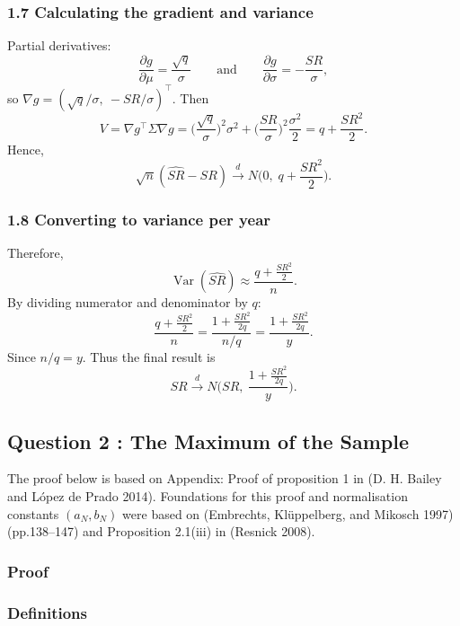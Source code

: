 \documentclass[
  12pt,
]{article}
\begin{document}
\subsubsection{1.7 Calculating the gradient and
variance}\label{calculating-the-gradient-and-variance}

Partial derivatives: \[
\frac{\partial g}{\partial\mu}=\frac{\sqrt{q}}{\sigma} \qquad \text{and} \qquad
\frac{\partial g}{\partial\sigma}=-\frac{SR}{\sigma},
\] so \(\nabla g=(\sqrt{q}/\sigma,\ -SR/\sigma)^\top\). Then \[
V=\nabla g^\top\Sigma\nabla g
= \Big(\frac{\sqrt{q}}{\sigma}\Big)^2\sigma^2 + \Big(\frac{SR}{\sigma}\Big)^2\frac{\sigma^2}{2}
= q + \frac{SR^2}{2}.
\] Hence, \[
\sqrt{n}(\widehat{SR}-SR)\xrightarrow{d} N\!\Big(0,\; q+\frac{SR^2}{2}\Big).
\]

\subsubsection{1.8 Converting to variance per
year}\label{converting-to-variance-per-year}

Therefore,\[
\operatorname{Var}(\widehat{SR})\approx\frac{q+\tfrac{SR^2}{2}}{n}.
\] By dividing numerator and denominator by \(q\): \[
\frac{q+\tfrac{SR^2}{2}}{n}=\frac{1+\tfrac{SR^2}{2q}}{\,n/q\,}= \frac{1+\tfrac{SR^2}{2q}}{y}.
\] Since \(n/q=y\). Thus the final result is \[
\widehat{SR}\xrightarrow{d} N\!\Big(SR,\ \frac{1+\tfrac{SR^2}{2q}}{y}\Big).
\]

\subsection{Question 2 : The Maximum of the
Sample}\label{question-2-the-maximum-of-the-sample}

The proof below is based on Appendix: Proof of proposition 1 in (D. H.
Bailey and López de Prado 2014). Foundations for this proof and
normalisation constants \((a_N,b_N)\) were based on (Embrechts,
Klüppelberg, and Mikosch 1997) (pp.138--147) and Proposition 2.1(iii) in
(Resnick 2008).

\subsubsection{Proof}\label{proof}

\subsubsection{Definitions}\label{definitions}
\end{document}
